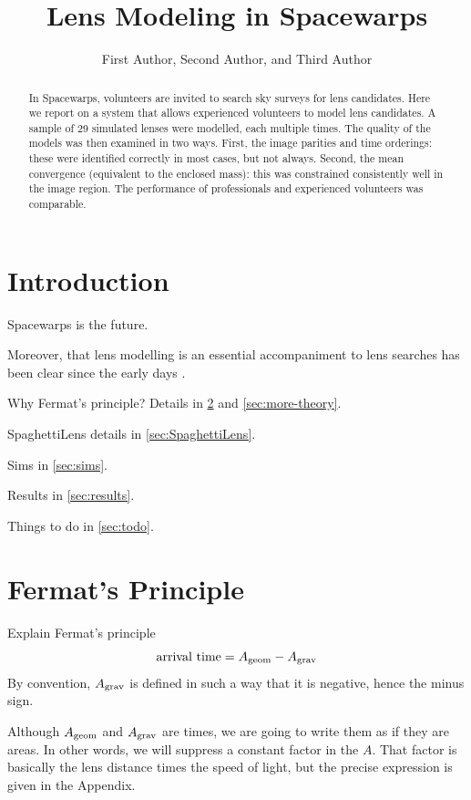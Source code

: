 \documentclass[12pt,preprint]{aastex}
\begin{document}
\title{Lens Modeling in Spacewarps}

\author{First Author,
Second Author, and
Third Author}

\begin{abstract}
In Spacewarps, volunteers are invited to search sky surveys for lens
candidates.  Here we report on a system that allows experienced
volunteers to model lens candidates.  A sample of 29 simulated lenses
were modelled, each multiple times.  The quality of the models was
then examined in two ways.  First, the image parities and time
orderings: these were identified correctly in most cases, but not
always.  Second, the mean convergence (equivalent to the enclosed
mass): this was constrained consistently well in the image region.
The performance of professionals and experienced volunteers was
comparable.
\end{abstract}

\keywords{}

\section{Introduction}

Spacewarps is the future.

Moreover, that lens modelling is an essential accompaniment to lens
searches has been clear since the early days \citep{1981ApJ...244..723Y}.

Why Fermat's principle?  Details in \ref{sec:Fermat} and
\ref{sec:more-theory}.

SpaghettiLens details in \ref{sec:SpaghettiLens}.

Sims in \ref{sec:sims}.

Results in \ref{sec:results}.

Things to do in \ref{sec:todo}.

\section{Fermat's Principle} \label{sec:Fermat}

Explain Fermat's principle
\begin{equation}
\hbox{arrival time} = A_{\rm geom} - A_{\rm grav}
\end{equation}
By convention, $A_{\rm grav}$ is defined in such a way that it is
negative, hence the minus sign.

Although $A_{\rm geom}$ and $A_{\rm grav}$ are times, we are going to
write them as if they are areas.  In other words, we will suppress a
constant factor in the $A$.  That factor is basically the lens
distance times the speed of light, but the precise expression is given
in the Appendix.
\end{document}
